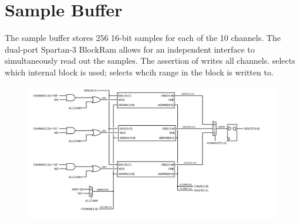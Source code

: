 
\section{Sample Buffer}

The sample buffer stores 256 16-bit samples for each of the 10
channels. The dual-port Spartan-3 BlockRam allows for an independent
interface to simultaneously read out the samples. The assertion of
 writes all channels.  selects which
internal block is used;  selects whcih range in the
block is written to.

\begin{figure}
\includegraphics[scale=1.0]{samplebuffer.svg}
\end{figure}
